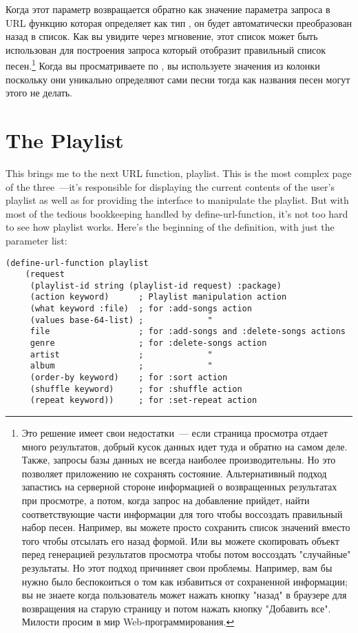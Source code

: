 Когда этот параметр возвращается обратно как значение параметра запроса  в
URL функцию которая определяет  как тип , он будет
автоматически преобразован назад в список. Как вы увидите через мгновение, этот список
может быть использован для построения запроса который отобразит правильный список
песен.\footnote{Это решение имеет свои недостатки~--- если страница просмотра отдает много
    результатов, добрый кусок данных идет туда и обратно на самом деле. Также, запросы
    базы данных не всегда наиболее производительны. Но это позволяет приложению не
    сохранять состояние. Альтернативный подход запастись на серверной стороне информацией
    о возвращенных результатах при просмотре, а потом, когда запрос на добавление прийдет,
    найти соответствующие части информации для того чтобы воссоздать правильный набор
    песен. Например, вы можете просто сохранить список значений вместо того чтобы отсылать
    его назад формой. Или вы можете скопировать объект  перед
    генерацией результатов просмотра чтобы потом воссоздать "случайные" результаты. Но
    этот подход причиняет свои проблемы. Например, вам бы нужно было беспокоиться о том
    как избавиться от сохраненной информации; вы не знаете когда пользователь может нажать
    кнопку "назад" в браузере для возвращения на старую страницу и потом нажать кнопку
"Добавить все". Милости просим в мир Web-программирования.} Когда вы просматриваете по
, вы используете значения из колонки  поскольку они уникально
определяют сами песни тогда как названия песен могут этого не делать.

\section{The Playlist}

This brings me to the next URL function, playlist. This is the most complex page of the
three~---it's responsible for displaying the current contents of the user's playlist as
well as for providing the interface to manipulate the playlist. But with most of the
tedious bookkeeping handled by define-url-function, it's not too hard to see how playlist
works. Here's the beginning of the definition, with just the parameter list:

\begin{lstlisting}
(define-url-function playlist 
    (request
     (playlist-id string (playlist-id request) :package)
     (action keyword)      ; Playlist manipulation action
     (what keyword :file)  ; for :add-songs action
     (values base-64-list) ;             "
     file                  ; for :add-songs and :delete-songs actions
     genre                 ; for :delete-songs action
     artist                ;             "
     album                 ;             "
     (order-by keyword)    ; for :sort action
     (shuffle keyword)     ; for :shuffle action
     (repeat keyword))     ; for :set-repeat action
\end{lstlisting}


